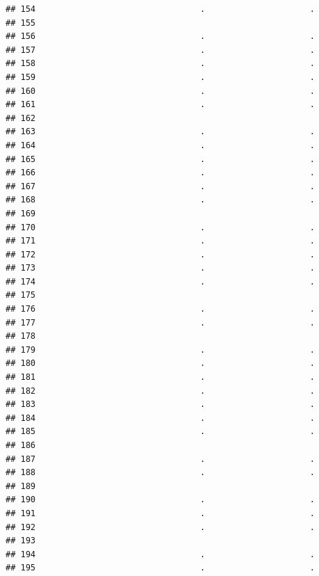 \documentclass[
]{article}
\begin{document}
\begin{verbatim}
## 154                                 .                     .
## 155                                                        
## 156                                 .                     .
## 157                                 .                     .
## 158                                 .                     .
## 159                                 .                     .
## 160                                 .                     .
## 161                                 .                     .
## 162                                                        
## 163                                 .                     .
## 164                                 .                     .
## 165                                 .                     .
## 166                                 .                     .
## 167                                 .                     .
## 168                                 .                     .
## 169                                                        
## 170                                 .                     .
## 171                                 .                     .
## 172                                 .                     .
## 173                                 .                     .
## 174                                 .                     .
## 175                                                        
## 176                                 .                     .
## 177                                 .                     .
## 178                                                        
## 179                                 .                     .
## 180                                 .                     .
## 181                                 .                     .
## 182                                 .                     .
## 183                                 .                     .
## 184                                 .                     .
## 185                                 .                     .
## 186                                                        
## 187                                 .                     .
## 188                                 .                     .
## 189                                                        
## 190                                 .                     .
## 191                                 .                     .
## 192                                 .                     .
## 193                                                        
## 194                                 .                     .
## 195                                 .                     .

\end{verbatim}
\end{document}
